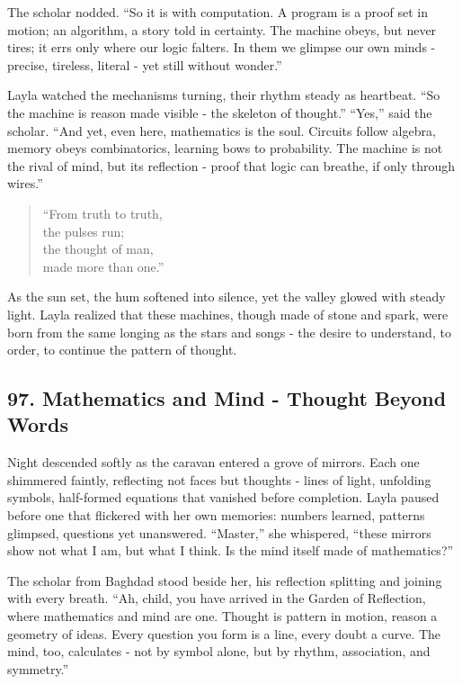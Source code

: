 \documentclass[
  letterpaper,
  DIV=11,
  numbers=noendperiod]{scrreprt}
\begin{document}
The scholar nodded. ``So it is with computation. A program is a proof
set in motion; an algorithm, a story told in certainty. The machine
obeys, but never tires; it errs only where our logic falters. In them we
glimpse our own minds - precise, tireless, literal - yet still without
wonder.''

Layla watched the mechanisms turning, their rhythm steady as heartbeat.
``So the machine is reason made visible - the skeleton of thought.''
``Yes,'' said the scholar. ``And yet, even here, mathematics is the
soul. Circuits follow algebra, memory obeys combinatorics, learning bows
to probability. The machine is not the rival of mind, but its reflection
- proof that logic can breathe, if only through wires.''

\begin{quote}
``From truth to truth,\\
the pulses run;\\
the thought of man,\\
made more than one.''
\end{quote}

As the sun set, the hum softened into silence, yet the valley glowed
with steady light. Layla realized that these machines, though made of
stone and spark, were born from the same longing as the stars and songs
- the desire to understand, to order, to continue the pattern of
thought.

\subsection{97. Mathematics and Mind - Thought Beyond
Words}\label{mathematics-and-mind---thought-beyond-words}

Night descended softly as the caravan entered a grove of mirrors. Each
one shimmered faintly, reflecting not faces but thoughts - lines of
light, unfolding symbols, half-formed equations that vanished before
completion. Layla paused before one that flickered with her own
memories: numbers learned, patterns glimpsed, questions yet unanswered.
``Master,'' she whispered, ``these mirrors show not what I am, but what
I think. Is the mind itself made of mathematics?''

The scholar from Baghdad stood beside her, his reflection splitting and
joining with every breath. ``Ah, child, you have arrived in the Garden
of Reflection, where mathematics and mind are one. Thought is pattern in
motion, reason a geometry of ideas. Every question you form is a line,
every doubt a curve. The mind, too, calculates - not by symbol alone,
but by rhythm, association, and symmetry.''
\end{document}
